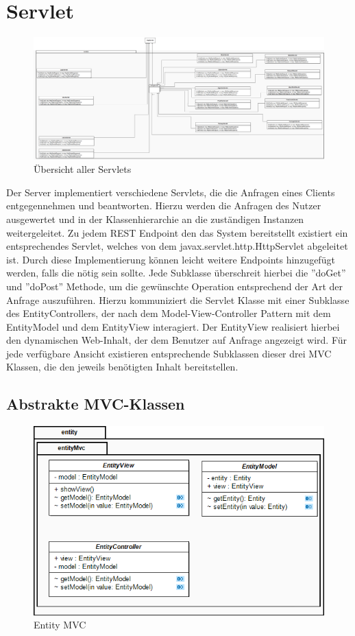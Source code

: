 \section{Servlet}

\begin{figure}[h]
\centering
\includegraphics[width=0.9\linewidth]{Grafik/Klassendiagramme/Servlet.png}
\caption{Übersicht aller Servlets}
\end{figure}


Der Server implementiert verschiedene Servlets, die die Anfragen eines Clients entgegennehmen und beantworten. Hierzu werden die Anfragen des Nutzer ausgewertet und in der Klassenhierarchie an die zuständigen Instanzen weitergeleitet. Zu jedem REST Endpoint den das System bereitstellt existiert ein entsprechendes Servlet, welches von dem javax.servlet.http.HttpServlet abgeleitet ist. Durch diese Implementierung können leicht weitere Endpoints hinzugefügt werden, falls die nötig sein sollte. Jede Subklasse überschreit hierbei die ''doGet'' und ''doPost'' Methode, um die gewünschte Operation entsprechend der Art der Anfrage auszuführen. Hierzu kommuniziert die Servlet Klasse mit einer Subklasse des EntityControllers, der nach dem Model-View-Controller Pattern mit dem EntityModel und dem EntityView interagiert. Der EntityView realisiert hierbei den dynamischen Web-Inhalt, der dem Benutzer auf Anfrage angezeigt wird. Für jede verfügbare Ansicht existieren entsprechende Subklassen dieser drei MVC Klassen, die den jeweils benötigten Inhalt bereitstellen. 


\subsection{Abstrakte MVC-Klassen}

\begin{figure}[h]
\centering
\includegraphics[width=0.4\linewidth]{Grafik/Klassendiagramme/Entity_mvc.png}
\caption{Entity MVC}
\end{figure}
